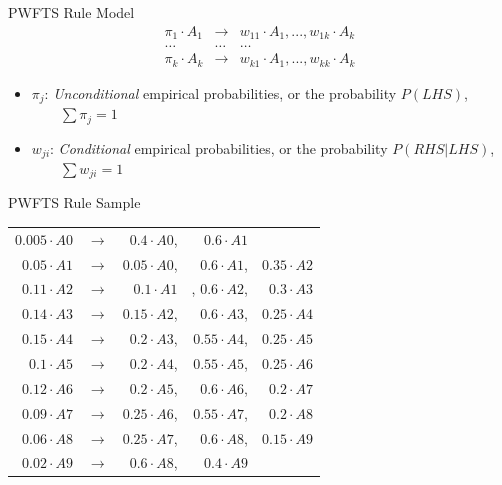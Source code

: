 \documentclass{beamer}
\begin{document}

\begin{frame}{PWFTS Rule Model}
\linespread{2}
$$
\begin{array}{rcl}
\pi_1 \cdot A_1 & \rightarrow &  w_{11} \cdot A_1, ..., w_{1k} \cdot A_k \\
\ldots & \ldots & \ldots \\
\pi_k \cdot A_k & \rightarrow &  w_{k1} \cdot A_1, ..., w_{kk} \cdot A_k
\end{array}
$$
\begin{itemize}
    \item $\pi_j$: \textit{Unconditional} empirical probabilities, or the probability $P(LHS)$, $\qquad\sum \pi_j = 1$
    \item $w_{ji}$: \textit{Conditional} empirical probabilities, or the probability $P(RHS|LHS)$, $\qquad\sum w_{ji} = 1$
\end{itemize}
\end{frame}


\begin{frame}{PWFTS Rule Sample}
    \centering
    \begin{tabular}{rcrrr}
        $0.005\cdot A0$ & $\rightarrow$ & $0.4\cdot A0$, & $0.6\cdot A1$ &   \\
        $0.05\cdot A1$ & $\rightarrow$ & $0.05\cdot A0$, & $0.6\cdot A1$, & $0.35\cdot A2$  \\
        $0.11\cdot A2$ & $\rightarrow$ & $0.1\cdot A1$&,  $0.6\cdot A2$, & $0.3\cdot A3$  \\
        $0.14\cdot A3$ & $\rightarrow$ & $0.15\cdot A2$, & $0.6\cdot A3$, & $0.25\cdot A4$  \\
        $0.15\cdot A4$ & $\rightarrow$ & $0.2\cdot A3$, & $0.55\cdot A4$, & $0.25\cdot A5$  \\
        $0.1\cdot A5$ & $\rightarrow$ & $0.2\cdot A4$, & $0.55\cdot A5$, & $0.25\cdot A6$  \\
        $0.12\cdot A6$ & $\rightarrow$ & $0.2\cdot A5$, & $0.6\cdot A6$, & $0.2\cdot A7$  \\
        $0.09\cdot A7$ & $\rightarrow$ & $0.25\cdot A6$, & $0.55\cdot A7$, & $0.2\cdot A8$  \\
        $0.06\cdot A8$ & $\rightarrow$ & $0.25\cdot A7$, & $0.6\cdot A8$, & $0.15\cdot A9$  \\
        $0.02\cdot A9$ & $\rightarrow$ & $0.6\cdot A8$, & $0.4\cdot A9$ &   \\
    \end{tabular}
\end{frame}
\end{document}
